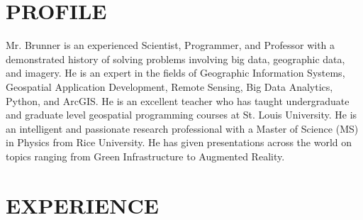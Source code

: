\documentclass{res}
\begin{document}
 
\address{\bf HOME ADDRESS\\122 Arabian Path\\ 
St. Peters, MO 63376\\ 636-222-3818\\ gregbrunn@gmail.com}
\address{\bf WORK ADDRESS \\ 3060 Little Hills Expy\\  St. Charles, MO 63301\\  636-949-6620 ext. 8557\\
gbrunner@esri.com}
                                  
\begin{resume}
\section{PROFILE}
Mr. Brunner is an experienced Scientist, Programmer, and Professor with a demonstrated history of solving problems involving big data, geographic data, and imagery. He is an expert in the fields of Geographic Information Systems, Geospatial Application Development, Remote Sensing, Big Data Analytics, Python, and ArcGIS. He is an excellent teacher who has taught undergraduate and graduate level geospatial programming courses at St. Louis University. He is an intelligent and passionate research professional with a Master of Science (MS) in Physics from Rice University. He has given presentations across the world on topics ranging from Green Infrastructure to Augmented Reality.

\section{EXPERIENCE}
   \vspace{-0.1in}	


\end{resume}
\end{document}
